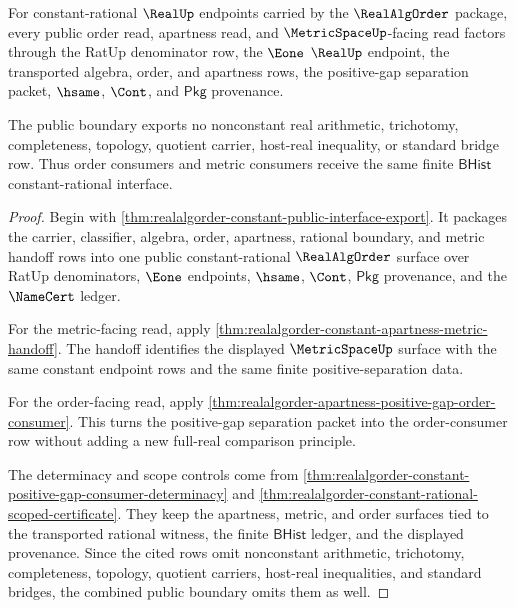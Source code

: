\begin{theorem}
\label{thm:realalgorder-constant-public-order-metric-interface}
For constant-rational $\RealUp$ endpoints carried by the $\RealAlgOrder$
package, every public order read, apartness read, and $\MetricSpaceUp$-facing
read factors through the RatUp denominator row, the $\Eone$ $\RealUp$
endpoint, the transported algebra, order, and apartness rows, the positive-gap
separation packet, $\hsame$, $\Cont$, and $\mathsf{Pkg}$ provenance.

The public boundary exports no nonconstant real arithmetic, trichotomy,
completeness, topology, quotient carrier, host-real inequality, or standard
bridge row. Thus order consumers and metric consumers receive the same finite
$\mathsf{BHist}$ constant-rational interface.
\end{theorem}
\begin{proof}
Begin with \autoref{thm:realalgorder-constant-public-interface-export}. It
packages the carrier, classifier, algebra, order, apartness, rational boundary,
and metric handoff rows into one public constant-rational $\RealAlgOrder$
surface over RatUp denominators, $\Eone$ endpoints, $\hsame$, $\Cont$,
$\mathsf{Pkg}$ provenance, and the $\NameCert$ ledger.

For the metric-facing read, apply
\autoref{thm:realalgorder-constant-apartness-metric-handoff}. The handoff
identifies the displayed $\MetricSpaceUp$ surface with the same constant
endpoint rows and the same finite positive-separation data.

For the order-facing read, apply
\autoref{thm:realalgorder-apartness-positive-gap-order-consumer}. This turns
the positive-gap separation packet into the order-consumer row without adding a
new full-real comparison principle.

The determinacy and scope controls come from
\autoref{thm:realalgorder-constant-positive-gap-consumer-determinacy} and
\autoref{thm:realalgorder-constant-rational-scoped-certificate}. They keep the
apartness, metric, and order surfaces tied to the transported rational witness,
the finite $\mathsf{BHist}$ ledger, and the displayed provenance. Since the
cited rows omit nonconstant arithmetic, trichotomy, completeness, topology,
quotient carriers, host-real inequalities, and standard bridges, the combined
public boundary omits them as well.
\end{proof}

